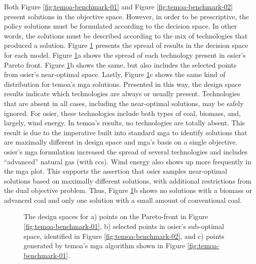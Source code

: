 Both Figure \ref{fig:temoa-benchmark-01} and Figure \ref{fig:temoa-benchmark-02}
present solutions in the objective space. However, in order to be prescriptive,
the policy solutions must be formulated according to the decision space. In
other words, the solutions must be described according to the mix of technologies that produced a
solution. Figure \ref{fig:temoa-benchmark-03} presents the spread of results in
the decision space for each model. Figure \ref{fig:temoa-benchmark-03}a shows
the spread of each technology present in \ac{osier}'s Pareto front. Figure
\ref{fig:temoa-benchmark-03}b shows the same, but also includes the
selected points from \ac{osier}'s near-optimal space. Lastly, Figure
\ref{fig:temoa-benchmark-03}c shows the same kind of distribution for
\ac{temoa}'s \ac{mga} solutions. Presented in this way, the design space results
indicate which technologies are always or usually present. Technologies that are
absent in all cases, including the near-optimal solutions, may be safely
ignored. For \ac{osier}, these technologies include both types of coal, biomass,
and, largely, wind energy. In \ac{temoa}'s results, no
technologies are totally absent. This result is due to the imperative built
into standard \ac{mga} to identify solutions that are maximally different in
design space and \ac{mga}'s basis on a single objective. \ac{osier}'s \ac{mga} formulation
increased the spread of several technologies and includes ``advanced'' natural gas
(with \ac{ccs}). Wind energy also shows up more frequently in the \ac{mga} plot.
This supports the assertion that \ac{osier} samples near-optimal
solutions based on maximally different solutions, with additional restrictions 
from the dual objective problem. Thus, Figure \ref{fig:temoa-benchmark-03}b shows
no solutions with a biomass or advanced coal and only one solution with a small amount
of conventional coal.

\newpage
\begin{figure}[ht!]
  \centering
  \resizebox{\columnwidth}{!}{}
  \caption{The design spaces for a) points on the Pareto-front in Figure
  \ref{fig:temoa-benchmark-01}, b) selected points in \ac{osier}'s sub-optimal
  space, identified in Figure \ref{fig:temoa-benchmark-02}, and c) points
  generated by \ac{temoa}'s \ac{mga} algorithm shown in Figure
  \ref{fig:temoa-benchmark-01}.}
  \label{fig:temoa-benchmark-03}
\end{figure}

 
\FloatBarrier